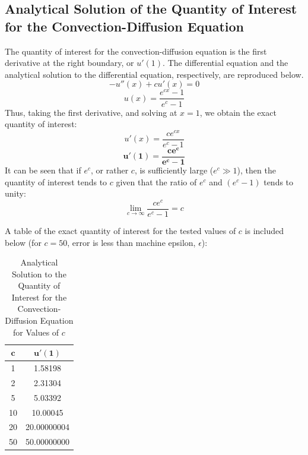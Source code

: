 \documentclass[10pt]{article}		%
\numberwithin{equation}{section}
\begin{document}
\newpage

\subsection{Analytical Solution of the Quantity of Interest for the Convection-Diffusion Equation}

The quantity of interest for the convection-diffusion equation is the first derivative at the right boundary, or $u'(1)$. The differential equation and the analytical solution to the differential equation, respectively, are reproduced below.
\begin{equation}
- u''(x)+cu'(x)=0
\end{equation}
\begin{equation}
u(x) = \frac{e^{cx}-1}{e^c-1}
\end{equation}
Thus, taking the first derivative, and solving at $x = 1$, we obtain the exact quantity of interest:
\begin{equation}
u'(x) = \frac{ce^{cx}}{e^c-1}
\end{equation}
\begin{equation}
\mathbf{u'(1) = \frac{ce^{c}}{e^c-1}}
\end{equation}
It can be seen that if $e^c$, or rather $c$, is sufficiently large ($e^c \gg 1$), then the quantity of interest tends to $c$ given that the ratio of $e^c$ and $(e^c -1)$ tends to unity:
\begin{equation}
\lim_{c\to\infty} \frac{ce^{c}}{e^c-1} = c
\end{equation}

A table of the exact quantity of interest for the tested values of $c$ is included below (for $c=50$, error is less than machine epsilon, $\epsilon$):
\begin{table}[H]
	\caption{Analytical Solution to the Quantity of Interest for the Convection-Diffusion Equation for Values of $c$}
\begin{tabular}{|c|c|}
	\hline 
	$\mathbf{c}$ & $\mathbf{u'(1)}$ \\ 
	\hline 
	1 & 1.58198 \\ 
	\hline 
	2 & 2.31304 \\ 
	\hline 
	5 & 5.03392 \\ 
	\hline 
	10 & 10.00045 \\ 
	\hline 
	20 & 20.00000004 \\ 
	\hline 
	50 & 50.00000000 \\ 
	\hline 
\end{tabular}
\end{table} 
\end{document}
